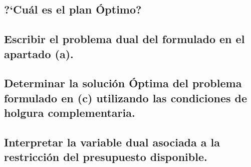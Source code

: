 \documentclass[10pt, a4paper]{article}
\begin{document}
			\paragraph{}


		\subsection{?`Cuál es el plan Óptimo?}

			\paragraph{}


		\subsection{Escribir el problema dual del formulado en el apartado (a).}

			\paragraph{}


		\subsection{Determinar la solución Óptima del problema formulado en (c) utilizando las condiciones de holgura complementaria.}

			\paragraph{}


		\subsection{Interpretar la variable dual asociada a la restricción del presupuesto disponible.}

			\paragraph{}
\end{document}
